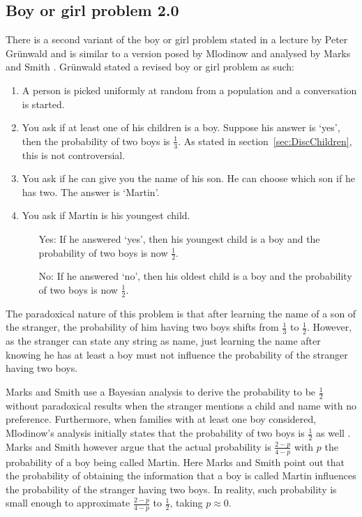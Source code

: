\documentclass[a4paper]{report}
\theoremstyle{plain}
\theoremstyle{definition}
\theoremstyle{remark}
\numberwithin{equation}{chapter}
\DeclareMathOperator{\1}{\mathbbm{1}}
\begin{document}
\subsection{Boy or girl problem 2.0}\label{sec:DiscChild2}
There is a second variant of the boy or girl problem stated in a lecture by Peter Grünwald \cite{Grunwald19} and is similar to a version posed by Mlodinow \cite{Mlodinow09} and analysed by Marks and Smith \cite{Marks11}. Grünwald stated a revised boy or girl problem as such:
\begin{enumerate}
    \item A person is picked uniformly at random from a population and a conversation is started.
    \item You ask if at least one of his children is a boy. Suppose his answer is `yes', then the probability of two boys is $\frac{1}{3}$. As stated in section~\ref{sec:DiscChildren}, this is not controversial.
    \item You ask if he can give you the name of his son. He can choose which son if he has two. The answer is `Martin'.
    \item You ask if Martin is his youngest child.
    \begin{itemize}
        \item[Yes:] If he answered `yes', then his youngest child is a boy and the probability of two boys is now $\frac{1}{2}$.
        \item[No:] If he answered `no', then his oldest child is a boy and the probability of two boys is now $\frac{1}{2}$.
    \end{itemize}
\end{enumerate}

The paradoxical nature of this problem is that after learning the name of a son of the stranger, the probability of him having two boys shifts from $\frac{1}{3}$ to $\frac{1}{2}$. However, as the stranger can state any string as name, just learning the name after knowing he has at least a boy must not influence the probability of the stranger having two boys.

Marks and Smith \cite{Marks11} use a Bayesian analysis to derive the probability to be $\frac{1}{2}$ without paradoxical results when the stranger mentions a child and name with no preference. Furthermore, when families with at least one boy considered, Mlodinow's analysis initially states that the probability of two boys is $\frac{1}{2}$ as well \cite{Marks11,Mlodinow09}. Marks and Smith however argue that the actual probability is $\frac{2-p}{4-p}$ with $p$ the probability of a boy being called Martin. Here Marks and Smith point out that the probability of obtaining the information that a boy is called Martin influences the probability of the stranger having two boys. In reality, such probability is small enough to approximate $\frac{2-p}{4-p}$ to $\frac{1}{2}$, taking $p\approx0$.
\end{document}
